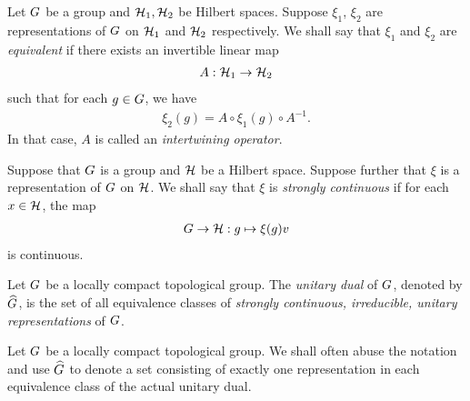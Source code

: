 \begin{definition}
\label{definition:equivalent_representations}
    Let $G$ be a group and $\mathcal{H}_1, \mathcal{H}_2$ be Hilbert spaces.
    Suppose $\xi_1$, $\xi_2$ are representations of $G$ on $\mathcal{H}_1$ and $\mathcal{H}_2$ respectively.
    We shall say that $\xi_1$ and $\xi_2$ are \emph{equivalent}
    if there exists an invertible linear map
    \begin{align*}
        A : \mathcal{H}_1 \to \mathcal{H}_2
    \end{align*}
    such that for each $g \in G$, we have
    \begin{align*}
        \xi_2(g) = A \circ \xi_1(g) \circ A^{-1}.
    \end{align*}
    In that case, $A$ is called an \emph{intertwining operator}.
\end{definition}

\begin{definition}
\label{definition:strongly_continuous_representation}
    Suppose that $G$ is a group and $\mathcal{H}$ be a Hilbert space.
    Suppose further that $\xi$ is a representation of $G$ on $\mathcal{H}$.
    We shall say that $\xi$ is \emph{strongly continuous}
    if for each $x \in \mathcal{H}$,
    the map
    \begin{align*}
        G \to \mathcal{H} : g \mapsto \xi(g) v
    \end{align*}
    is continuous.
\end{definition}

\begin{definition}
\label{definition:unitary_dual}
    Let $G$ be a locally compact topological group.
    The \emph{unitary dual} of $G$, denoted by ${\widehat{G}}$,
    is the set of all equivalence classes of
    \emph{strongly continuous, irreducible, unitary representations} of $G$.
\end{definition}

\begin{remark}
    Let $G$ be a locally compact topological group.
    We shall often abuse the notation and use ${\widehat{G}}$ to denote a set consisting of
    exactly one representation in each equivalence class of the actual unitary dual.
\end{remark}

